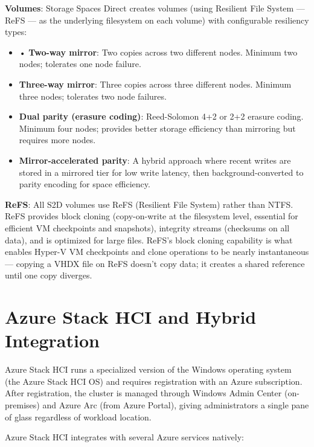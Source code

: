 \textbf{Volumes}: Storage Spaces Direct creates volumes (using Resilient File System --- ReFS --- as the underlying filesystem on each volume) with configurable resiliency types:

\begin{itemize}
  \item • \textbf{Two-way mirror}: Two copies across two different nodes. Minimum two nodes; tolerates one node failure.
  \item \textbf{Three-way mirror}: Three copies across three different nodes. Minimum three nodes; tolerates two node failures.
  \item \textbf{Dual parity (erasure coding)}: Reed-Solomon 4+2 or 2+2 erasure coding. Minimum four nodes; provides better storage efficiency than mirroring but requires more nodes.
  \item \textbf{Mirror-accelerated parity}: A hybrid approach where recent writes are stored in a mirrored tier for low write latency, then background-converted to parity encoding for space efficiency.
\end{itemize}

\textbf{ReFS}: All S2D volumes use ReFS (Resilient File System) rather than NTFS. ReFS provides block cloning (copy-on-write at the filesystem level, essential for efficient VM checkpoints and snapshots), integrity streams (checksums on all data), and is optimized for large files. ReFS's block cloning capability is what enables Hyper-V VM checkpoints and clone operations to be nearly instantaneous --- copying a VHDX file on ReFS doesn't copy data; it creates a shared reference until one copy diverges.

\section{Azure Stack HCI and Hybrid Integration}
Azure Stack HCI runs a specialized version of the Windows operating system (the Azure Stack HCI OS) and requires registration with an Azure subscription. After registration, the cluster is managed through Windows Admin Center (on-premises) and Azure Arc (from Azure Portal), giving administrators a single pane of glass regardless of workload location.

Azure Stack HCI integrates with several Azure services natively:

